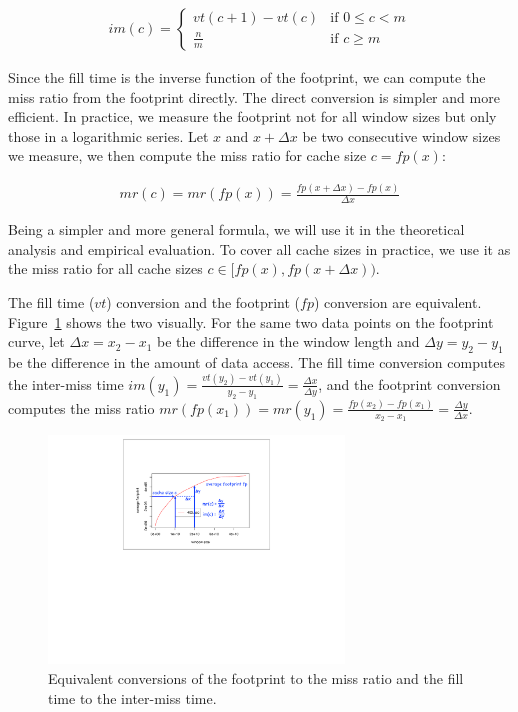 \begin{align*}
im(c) = 
\begin{cases}
vt(c+1)-vt(c) & \text{if } 0 \le c < m \\
\frac{n}{m} & \text{if } c \ge m
\end{cases}
\end{align*}

Since the fill time is the inverse function of the footprint, we can
compute the miss ratio from the footprint directly. The direct
conversion is simpler and more efficient. In practice, we measure the
footprint not for all window sizes but only those in a logarithmic
series.  Let $x$ and $x+\Delta x$ be two consecutive window sizes we
measure, we then compute the miss ratio for cache size $c = fp(x)$:

\begin{align*}
mr(c) = mr(fp(x)) = \frac{fp(x+\Delta x) - fp(x)}{\Delta x}
\end{align*}

\noindent 

Being a simpler and more general formula, we will use it in the theoretical
analysis and empirical evaluation.  To cover all cache sizes in practice, we use it as
the miss ratio for all cache sizes $c \in [fp(x), fp(x+\Delta x))$.

The fill time ($vt$) conversion and the footprint ($fp$) conversion
are equivalent.  Figure~\ref{fig:fp2mr} shows the two visually.  For
the same two data points on the footprint curve, let $\Delta x = x_2 -
x_1$ be the difference in the window length and $\Delta y = y_2 - y_1$
be the difference in the amount of data access.  The fill time
conversion computes the inter-miss time $im(y_1) = \frac{vt(y_2) -
  vt(y_1)}{y_2 - y_1} = \frac{\Delta x}{\Delta y}$, and the footprint
conversion computes the miss ratio $mr(fp(x_1)) = mr(y_1) =
\frac{fp(x_2) - fp(x_1)}{x_2 - x_1} = \frac{\Delta y}{\Delta x}$.

\begin{figure}[t!]
\centering
\includegraphics[width=0.7\textwidth]{figures/model/fp2mr.pdf}
\caption{Equivalent conversions of the footprint to the
  miss ratio and the fill time to the inter-miss time.}
\label{fig:fp2mr}
\end{figure}

